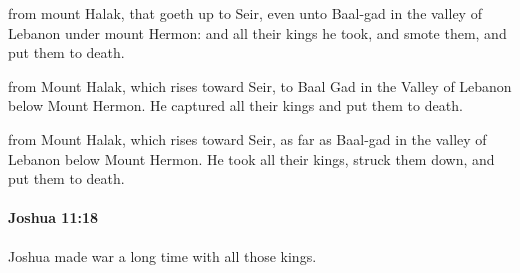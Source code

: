 			\begin{versebox}
					\item[BHS] 
					\item[ASV] from mount Halak, that goeth up to Seir, even unto Baal-gad in the valley of Lebanon under mount Hermon: and all their kings he took, and smote them, and put them to death.
					\item[NIV] from Mount Halak, which rises toward Seir, to Baal Gad in the Valley of Lebanon below Mount Hermon. He captured all their kings and put them to death.
					\item[NRSV] from Mount Halak, which rises toward Seir, as far as Baal-gad in the valley of Lebanon below Mount Hermon. He took all their kings, struck them down, and put them to death.
			\end{versebox}

		\paragraph{Joshua 11:18} %
			\label{JOSHUA-11-18}

			Joshua made war a long time with all those kings.


